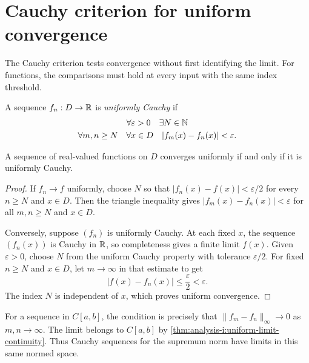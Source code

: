 \section{Cauchy criterion for uniform convergence}
\label{sec:analysis-i:cauchy-criterion-for-uniform-convergence}


The Cauchy criterion tests convergence without first identifying the
limit. For functions, the comparisons must hold at every input with
the same index threshold.

\begin{definition}
  \label{thm:analysis-i:uniformly-cauchy}
  A sequence $f_n:D\to\mathbb{R}$ is \emph{uniformly Cauchy} if
  \[
    \begin{gathered}
      \forall\varepsilon>0\quad\exists N\in\mathbb{N}\\
      \forall m,n\ge N\quad\forall x\in D\quad
      |f_m(x)-f_n(x)|<\varepsilon.
    \end{gathered}
  \]
\end{definition}

\begin{theorem}
  \label{thm:analysis-i:uniform-cauchy-criterion}
  A sequence of real-valued functions on $D$ converges uniformly if
  and only if it is uniformly Cauchy.
\end{theorem}
\begin{proof}
  If $f_n\to f$ uniformly, choose $N$ so that
  $|f_n(x)-f(x)|<\varepsilon/2$ for every $n\ge N$ and $x\in D$.
  Then the triangle inequality gives
  $|f_m(x)-f_n(x)|<\varepsilon$ for all $m,n\ge N$ and $x\in D$.

  Conversely, suppose $(f_n)$ is uniformly Cauchy. At each fixed $x$,
  the sequence $(f_n(x))$ is Cauchy in $\mathbb{R}$, so completeness gives a
  finite limit $f(x)$. Given $\varepsilon>0$, choose $N$ from the
  uniform Cauchy property with tolerance $\varepsilon/2$. For fixed
  $n\ge N$ and $x\in D$, let $m\to\infty$ in that estimate to get
  \[
    |f(x)-f_n(x)|\le\frac{\varepsilon}{2}<\varepsilon.
  \]
  The index $N$ is independent of $x$, which proves uniform convergence.
\end{proof}

For a sequence in $C[a,b]$, the condition is precisely that
$\|f_m-f_n\|_\infty\to0$ as $m,n\to\infty$. The limit belongs to
$C[a,b]$ by \autoref{thm:analysis-i:uniform-limit-continuity}.
Thus Cauchy sequences for the supremum norm have limits in this same
normed space.

